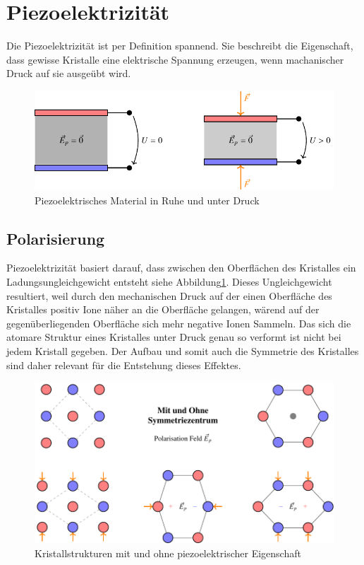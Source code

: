 \section{Piezoelektrizität}
Die Piezoelektrizität ist per Definition spannend.
Sie beschreibt die Eigenschaft, dass gewisse Kristalle eine elektrische Spannung erzeugen, wenn machanischer Druck auf sie ausgeübt wird.

\begin{figure}
    \centering
    \includegraphics[]{papers/punktgruppen/figures/piezo} %
    \caption{Piezoelektrisches Material in Ruhe und unter Druck}
    \label{fig:punktgruppen:basicPiezo}
\end{figure}

\subsection{Polarisierung}
Piezoelektrizität basiert darauf, dass zwischen den Oberflächen des Kristalles ein Ladungsungleichgewicht entsteht siehe Abbildung\ref{fig:punktgruppen:basicPiezo}.
Dieses Ungleichgewicht resultiert, 
weil durch den mechanischen Druck auf der einen Oberfläche des Kristalles positiv Ione näher an die Oberfläche gelangen,
wärend auf der gegenüberliegenden Oberfläche sich mehr negative Ionen Sammeln.
Das sich die atomare Struktur eines Kristalles unter Druck genau so verformt ist nicht bei jedem Kristall gegeben.
Der Aufbau und somit auch die Symmetrie des Kristalles sind daher relevant für die Entstehung dieses Effektes.

\begin{figure}
    \centering
    \includegraphics[]{papers/punktgruppen/figures/piezo-atoms} 
    \caption{Kristallstrukturen mit und ohne piezoelektrischer Eigenschaft}
    \label{fig:punktgruppen:atomPiezo}
\end{figure}

